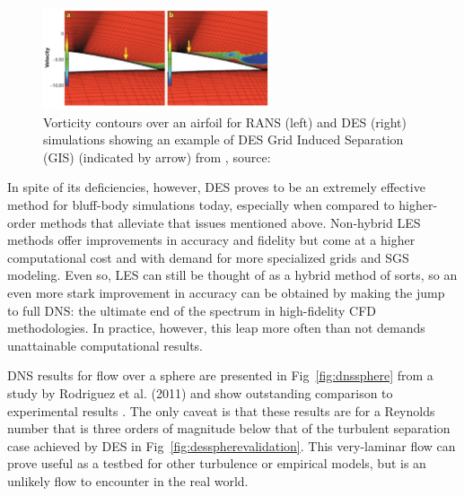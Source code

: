 \documentclass[journal]{new-aiaa}
\begin{document}
\begin{figure}[H]
\begin{center}
\includegraphics[width=0.6\textwidth]{Images/logan/spalart2009detachededdy_GridInducedSeparation.pdf}
\caption{ Vorticity contours over an airfoil for RANS (left) and DES (right) simulations showing an example of DES Grid Induced Separation (GIS) (indicated by arrow) from \cite{spalart2009detachededdy}, source: \cite{menter2004adaptation} }
\label{fig:desgridinducedseparation}
\end{center}
\end{figure}


In spite of its deficiencies, however, DES proves to be an extremely effective method for bluff-body simulations today, especially when compared to higher-order methods that alleviate that issues mentioned above. Non-hybrid LES methods offer improvements in accuracy and fidelity but come at a higher computational cost and with demand for more specialized grids and SGS modeling. Even so, LES can still be thought of as a hybrid method of sorts, so an even more stark improvement in accuracy can be obtained by making the jump to full DNS: the ultimate end of the spectrum in high-fidelity CFD methodologies. In practice, however, this leap more often than not demands unattainable computational results.

DNS results for flow over a sphere are presented in Fig~\ref{fig:dnssphere} from a study by Rodriguez et al. (2011) and show outstanding comparison to experimental results \cite{rodriguez2011direct}. The only caveat is that these results are for a Reynolds number that is three orders of magnitude below that of the turbulent separation case achieved by DES in Fig~\ref{fig:desspherevalidation}. This very-laminar flow can prove useful as a testbed for other turbulence or empirical models, but is an unlikely flow to encounter in the real world.
\end{document}
